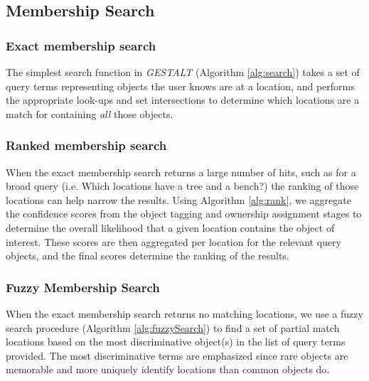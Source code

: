 \subsection{Membership Search}

\subsubsection{\textbf{Exact membership search}}
The simplest search function in \emph{GESTALT} (Algorithm \ref{alg:search}) takes a set of query terms representing objects the user knows are at a location, and performs the appropriate look-ups and set intersections to determine which locations are a match for containing \textit{all} those objects.

\subsubsection{\textbf{Ranked membership search}}
When the exact membership search returns a large number of hits, such as for a broad query (i.e. Which locations have a tree and a bench?) the ranking of those locations can help narrow the results. Using Algorithm \ref{alg:rank}, we aggregate the confidence scores from the object tagging and ownership assignment stages to determine the overall likelihood that a given location contains the object of interest. These scores are then aggregated per location for the relevant query objects, and the final scores determine the ranking of the results. 

\subsubsection{\textbf{Fuzzy Membership Search}}
When the exact membership search returns no matching locations, we use a fuzzy search procedure (Algorithm \ref{alg:fuzzySearch}) to find a set of partial match locations based on the most discriminative object(s) in the list of query terms provided. 
The most discriminative terms are emphasized since rare objects are memorable and more uniquely identify locations than common objects do.

